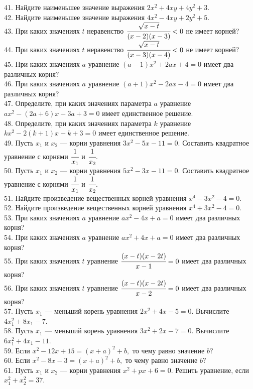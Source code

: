 \documentclass[12pt]{article}
\begin{document}
41. Найдите наименьшее значение выражения $2x^2+4xy+4y^2+3.$\\
42. Найдите наименьшее значение выражения $4x^2-4xy+2y^2+5.$\\
43. При каких значениях $t$ неравенство $\cfrac{\sqrt{x-t}}{(x-2)(x-3)}<0$ не имеет корней?\\
44. При каких значениях $t$ неравенство $\cfrac{\sqrt{x-t}}{(x-3)(x-4)}<0$ не имеет корней?\\
45. При каких значениях $a$ уравнение $(a-1)x^2+2ax+4=0$ имеет два различных корня?\\
46. При каких значениях $a$ уравнение $(a+1)x^2-2ax-4=0$ имеет два различных корня?\\
47. Определите, при каких значениях параметра $a$ уравнение $ax^2-(2a+6)x+3a+3=0$ имеет единственное решение.\\
48. Определите, при каких значениях параметра $k$ уравнение $kx^2-2(k+1)x+k+3=0$ имеет единственное решение.\\
49. Пусть $x_1$ и $x_2$ --- корни уравнения $3x^2-5x-11=0.$ Составить квадратное уравнение с корнями $\cfrac{1}{x_1}$ и $\cfrac{1}{x_2}.$\\
50. Пусть $x_1$ и $x_2$ --- корни уравнения $5x^2-3x-11=0.$ Составить квадратное уравнение с корнями $\cfrac{1}{x_1}$ и $\cfrac{1}{x_2}.$\\
51. Найдите произведение вещественных корней уравнения $x^4-3x^2-4=0.$\\
52. Найдите произведение вещественных корней уравнения $x^4+3x^2-4=0.$\\
53. При каких значениях $a$ уравнение $ax^2-4x+a=0$ имеет два различных корня?\\
54. При каких значениях $a$ уравнение $ax^2+4x+a=0$ имеет два различных корня?\\
55. При каких значениях $t$ уравнение $\cfrac{(x-t)(x-2t)}{x-1}=0$ имеет два различных корня?\\
56. При каких значениях $t$ уравнение $\cfrac{(x-t)(x-2t)}{x-2}=0$ имеет два различных корня?\\
57. Пусть $x_1$ --- меньший корень уравнения $2x^2+4x-5=0.$ Вычислите $4x_1^2+8x_1-7.$\\
58. Пусть $x_1$ --- меньший корень уравнения $3x^2+2x-7=0.$ Вычислите $6x_1^2+4x_1-11.$\\
59. Если $x^2-12x+15=(x+a)^2+b,$ то чему равно значение $b?$\\
60. Если $x^2-8x-3=(x+a)^2+b,$ то чему равно значение $b?$\\
61. Пусть $x_1$ и $x_2$ --- корни уравнения $x^2+px+6=0.$ Решить уравнение, если $x_1^2+x_2^2=37.$\\
\end{document}
